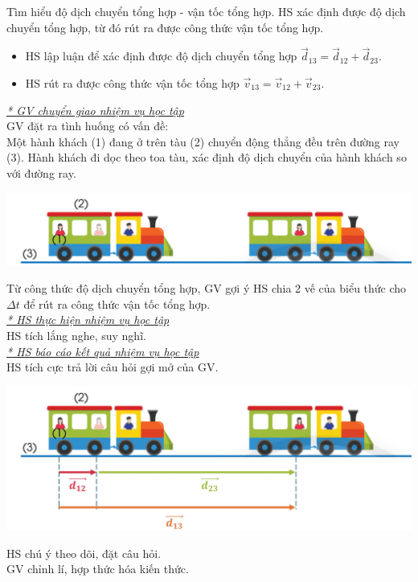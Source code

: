 \hoatdong
{Tìm hiểu độ dịch chuyển tổng hợp - vận tốc tổng hợp.
}
{HS xác định được độ dịch chuyển tổng hợp, từ đó rút ra được công thức vận tốc tổng hợp.
}
{\begin{itemize}
		\item HS lập luận để xác định được độ dịch chuyển tổng hợp $\vec{d}_{13}=\vec{d}_{12}+\vec{d}_{23}$.
		\item HS rút ra được công thức vận tốc tổng hợp $\vec{v}_{13}=\vec{v}_{12}+\vec{v}_{23}$.
	\end{itemize}
	
}
{\textit{\underline{* GV chuyển giao nhiệm vụ học tập}}\\
	GV đặt ra tình huống có vấn đề:\\
	Một hành khách (1) đang ở trên tàu (2) chuyển động thẳng đều trên đường ray (3). Hành khách đi dọc theo toa tàu, xác định độ dịch chuyển của hành khách so với đường ray.
	\begin{center}
		\includegraphics[width=0.7\linewidth]{figs/G10-BAI5-4}
	\end{center}
	Từ công thức độ dịch chuyển tổng hợp, GV gợi ý HS chia 2 vế của biểu thức cho $\Delta t$ để rút ra công thức vận tốc tổng hợp.\\
	\textit{\underline{* HS thực hiện nhiệm vụ học tập}}\\
	HS tích lắng nghe, suy nghĩ.\\
	\textit{\underline{* HS báo cáo kết quả nhiệm vụ học tập}}\\
	HS tích cực trả lời câu hỏi gợi mở của GV.
	\begin{center}
		\includegraphics[width=0.7\linewidth]{figs/G10-BAI5-5}
	\end{center}
	HS chú ý theo dõi, đặt câu hỏi.\\
	GV chỉnh lí, hợp thức hóa kiến thức.
	
	
}
